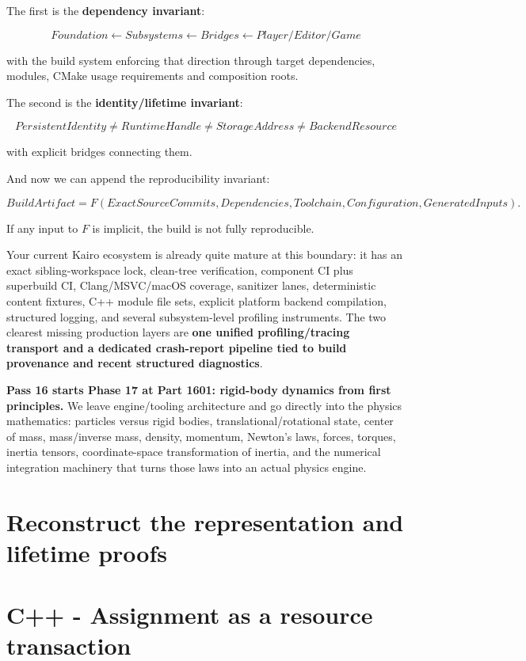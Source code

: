 The first is the \textbf{dependency invariant}:

\[
\boxed{
Foundation
\leftarrow
Subsystems
\leftarrow
Bridges
\leftarrow
Player/Editor/Game
}
\]

with the build system enforcing that direction through target dependencies, modules, CMake usage requirements and composition roots.

The second is the \textbf{identity/lifetime invariant}:

\[
\boxed{
PersistentIdentity
\neq
RuntimeHandle
\neq
StorageAddress
\neq
BackendResource
}
\]

with explicit bridges connecting them.

And now we can append the reproducibility invariant:

\[
\boxed{
BuildArtifact
=
F(
ExactSourceCommits,
Dependencies,
Toolchain,
Configuration,
GeneratedInputs
).
}
\]

If any input to \(F\) is implicit, the build is not fully reproducible.

Your current Kairo ecosystem is already quite mature at this boundary: it has an exact sibling-workspace lock, clean-tree verification, component CI plus superbuild CI, Clang/MSVC/macOS coverage, sanitizer lanes, deterministic content fixtures, C++ module file sets, explicit platform backend compilation, structured logging, and several subsystem-level profiling instruments. The two clearest missing production layers are \textbf{one unified profiling/tracing transport and a dedicated crash-report pipeline tied to build provenance and recent structured diagnostics}.

\textbf{Pass 16 starts Phase 17 at Part 1601: rigid-body dynamics from first principles.} We leave engine/tooling architecture and go directly into the physics mathematics: particles versus rigid bodies, translational/rotational state, center of mass, mass/inverse mass, density, momentum, Newton's laws, forces, torques, inertia tensors, coordinate-space transformation of inertia, and the numerical integration machinery that turns those laws into an actual physics engine.

\section{Reconstruct the representation and lifetime proofs}\label{01-foundations-i-ch010-reconstruct-the-representation-and-lifetime-proofs}

\section{C++ - Assignment as a resource transaction}\label{01-foundations-i-ch010-c---assignment-as-a-resource-transaction}

